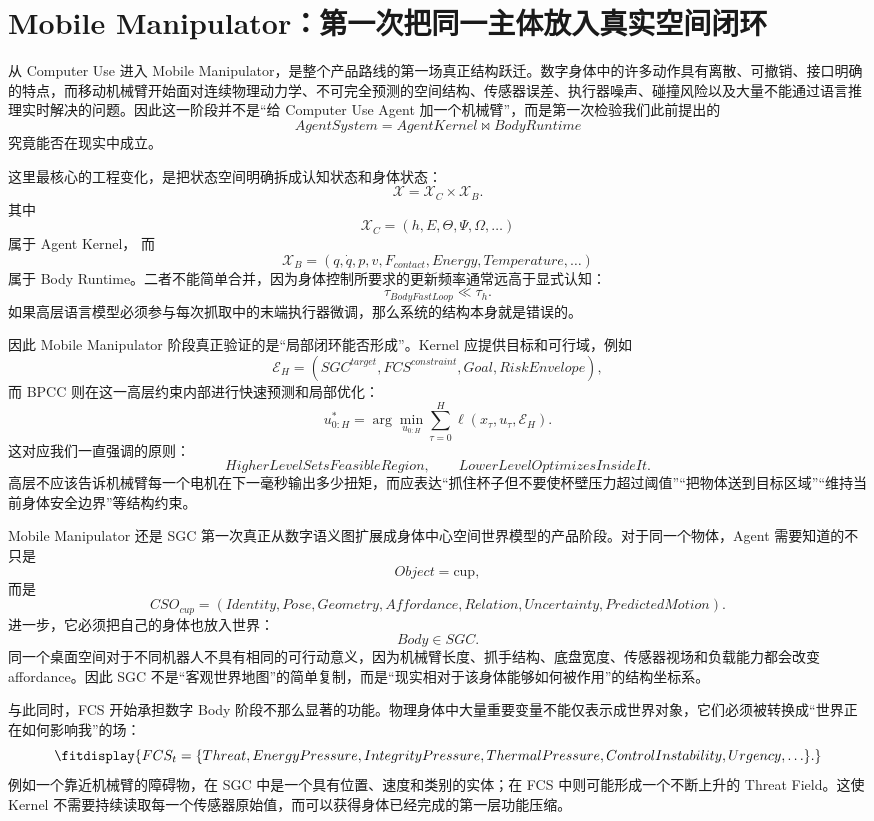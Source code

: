 \section{Mobile Manipulator：第一次把同一主体放入真实空间闭环}

从 Computer Use 进入 Mobile Manipulator，是整个产品路线的第一场真正结构跃迁。数字身体中的许多动作具有离散、可撤销、接口明确的特点，而移动机械臂开始面对连续物理动力学、不可完全预测的空间结构、传感器误差、执行器噪声、碰撞风险以及大量不能通过语言推理实时解决的问题。因此这一阶段并不是“给 Computer Use Agent 加一个机械臂”，而是第一次检验我们此前提出的
\[
\boxed{
AgentSystem
=
AgentKernel
\bowtie
BodyRuntime
}
\]
究竟能否在现实中成立。

这里最核心的工程变化，是把状态空间明确拆成认知状态和身体状态：
\[
\mathcal{X}
=
\mathcal{X}_C
\times
\mathcal{X}_B.
\]
其中
\[
\mathcal{X}_C
=
(h,E,\Theta,\Psi,\Omega,\ldots)
\]
属于 Agent Kernel，
而
\[
\mathcal{X}_B
=
(q,\dot q,p,v,F_{contact},Energy,Temperature,\ldots)
\]
属于 Body Runtime。二者不能简单合并，因为身体控制所要求的更新频率通常远高于显式认知：
\[
\tau_{BodyFastLoop}
\ll
\tau_h.
\]
如果高层语言模型必须参与每次抓取中的末端执行器微调，那么系统的结构本身就是错误的。

因此 Mobile Manipulator 阶段真正验证的是“局部闭环能否形成”。Kernel 应提供目标和可行域，例如
\[
\mathcal{E}_H
=
(
SGC^{target},
FCS^{constraint},
Goal,
RiskEnvelope
),
\]
而 BPCC 则在这一高层约束内部进行快速预测和局部优化：
\[
u_{0:H}^{*}
=
\arg\min_{u_{0:H}}
\sum_{\tau=0}^{H}
\ell(
x_{\tau},
u_{\tau},
\mathcal{E}_H
).
\]
这对应我们一直强调的原则：
\[
\boxed{
HigherLevelSetsFeasibleRegion,
\qquad
LowerLevelOptimizesInsideIt.
}
\]
高层不应该告诉机械臂每一个电机在下一毫秒输出多少扭矩，而应表达“抓住杯子但不要使杯壁压力超过阈值”“把物体送到目标区域”“维持当前身体安全边界”等结构约束。

Mobile Manipulator 还是 SGC 第一次真正从数字语义图扩展成身体中心空间世界模型的产品阶段。对于同一个物体，Agent 需要知道的不只是
\[
Object=\text{cup},
\]
而是
\[
CSO_{cup}
=
(
Identity,
Pose,
Geometry,
Affordance,
Relation,
Uncertainty,
PredictedMotion
).
\]
进一步，它必须把自己的身体也放入世界：
\[
\boxed{
Body\in SGC.
}
\]
同一个桌面空间对于不同机器人不具有相同的可行动意义，因为机械臂长度、抓手结构、底盘宽度、传感器视场和负载能力都会改变 affordance。因此 SGC 不是“客观世界地图”的简单复制，而是“现实相对于该身体能够如何被作用”的结构坐标系。

与此同时，FCS 开始承担数字 Body 阶段不那么显著的功能。物理身体中大量重要变量不能仅表示成世界对象，它们必须被转换成“世界正在如何影响我”的场：
\[
\fitdisplay{
FCS_t
=
\{
Threat,
EnergyPressure,
IntegrityPressure,
ThermalPressure,
ControlInstability,
Urgency,\ldots
\}.
}
\]
例如一个靠近机械臂的障碍物，在 SGC 中是一个具有位置、速度和类别的实体；在 FCS 中则可能形成一个不断上升的 Threat Field。这使 Kernel 不需要持续读取每一个传感器原始值，而可以获得身体已经完成的第一层功能压缩。

